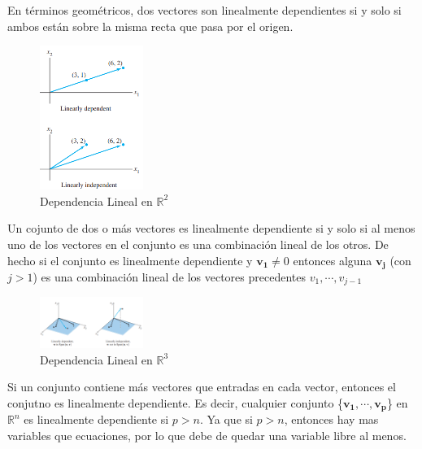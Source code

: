 \documentclass{article}
\begin{document}
En términos geométricos, dos vectores son linealmente dependientes si y solo si ambos están sobre la misma recta que pasa por el origen. 

\begin{figure}[ht]
    \centerline{\includegraphics[width=0.3\textwidth]{image14.png}}
    \caption{Dependencia Lineal en $\mathbb{R}^2$}
\end{figure}

\begin{tcolorbox}[colback=blue!10!white,colframe=blue!60!black,title=Caracterización de conjuntos linealmente dependientes]
    Un cojunto de dos o más vectores es linealmente dependiente si y solo si al menos uno de los vectores en el conjunto es una combinación lineal de los otros. De hecho si el conjunto es linealmente dependiente y $\mathbf{v_1} \neq 0$ entonces alguna $\mathbf{v_j}$ (con $j > 1$) es una combinación lineal de los vectores precedentes $v_1, \dotsb, v_{j-1}$
\end{tcolorbox}

\begin{figure}[ht]
    \centerline{\includegraphics[width=0.3\textwidth]{image15.png}}
    \caption{Dependencia Lineal en $\mathbb{R}^3$}
\end{figure}

\begin{tcolorbox}[colback=red!10!white, colframe=red!70!black, title=Caso Especial]
    Si un conjunto contiene más vectores que entradas en cada vector, entonces el conjutno es linealmente dependiente. Es decir, cualquier conjunto \{$\mathbf{v_1}, \dotsb, \mathbf{v_p}$\} en $\mathbb{R}^n$ es linealmente dependiente si $p > n$. 
    Ya que si $p > n$, entonces hay mas variables que ecuaciones, por lo que debe de quedar una variable libre al menos.
\end{tcolorbox}
\end{document}
